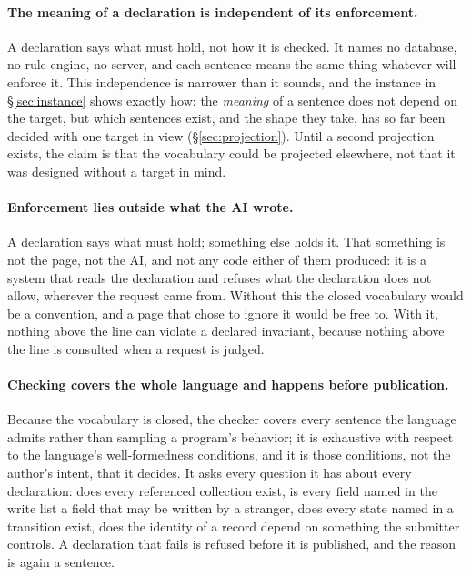 \documentclass[11pt]{article}
\begin{document}
\paragraph{The meaning of a declaration is independent of its enforcement.} A declaration says what must hold, not how it is checked. It names no database, no rule engine, no server, and each sentence means the same thing whatever will enforce it. This independence is narrower than it sounds, and the instance in \S\ref{sec:instance} shows exactly how: the \emph{meaning} of a sentence does not depend on the target, but which sentences exist, and the shape they take, has so far been decided with one target in view (\S\ref{sec:projection}). Until a second projection exists, the claim is that the vocabulary could be projected elsewhere, not that it was designed without a target in mind.

\paragraph{Enforcement lies outside what the AI wrote.} A declaration says what must hold; something else holds it. That something is not the page, not the AI, and not any code either of them produced: it is a system that reads the declaration and refuses what the declaration does not allow, wherever the request came from. Without this the closed vocabulary would be a convention, and a page that chose to ignore it would be free to. With it, nothing above the line can violate a declared invariant, because nothing above the line is consulted when a request is judged.

\paragraph{Checking covers the whole language and happens before publication.} Because the vocabulary is closed, the checker covers every sentence the language admits rather than sampling a program's behavior; it is exhaustive with respect to the language's well-formedness conditions, and it is those conditions, not the author's intent, that it decides. It asks every question it has about every declaration: does every referenced collection exist, is every field named in the write list a field that may be written by a stranger, does every state named in a transition exist, does the identity of a record depend on something the submitter controls. A declaration that fails is refused before it is published, and the reason is again a sentence.
\end{document}
